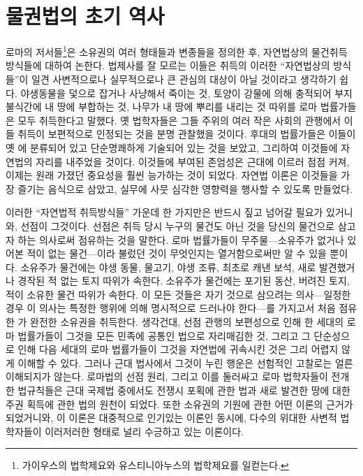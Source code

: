 \chapter{물권법의 초기 역사}

로마의  저서들\footnote{%
  가이우스의 법학제요와 유스티니아누스의 법학제요를 일컫는다.
}은
소유권의 여러 형태들과 변종들을 정의한 후,
자연법상의 물건취득 방식들에 대하여 논한다.
법제사를 잘 모르는 이들은
취득의 이러한 ``자연법상의 방식들''이
일견
사변적으로나 실무적으로나 큰 관심의 대상이 아닐 것이라고
생각하기 쉽다.
야생동물을 덫으로 잡거나 사냥해서 죽이는 것,
토양이 강물에 의해 충적되어 부지불식간에
내 땅에 부합하는 것,
나무가 내 땅에 뿌리를 내리는 것 따위를
로마 법률가들은 모두  취득한다고 말했다.
옛 법학자들은
그들 주위의 여러 작은 사회의 관행에서
이들 취득이
보편적으로 인정되는 것을 분명 관찰했을 것이다.
후대의 법률가들은
이들이 옛 에 분류되어 있고
단순명쾌하게 기술되어 있는 것을 보았고, 그리하여
이것들에
자연법의 자리를
내주었을 것이다.
이것들에 부여된 존엄성은 근대에 이르러 점점 커져,
이제는 원래 가졌던 중요성을 훨씬 능가하는 것이 되었다.
자연법 이론은 이것들을 가장 즐기는 음식으로 삼았고,
실무에 사뭇 심각한 영향력을 행사할 수 있도록 만들었다.

이러한 ``자연법적 취득방식들'' 가운데
한 가지만은 반드시 짚고 넘어갈 필요가 있거니와,
선점이 그것이다.
선점은
취득 당시 누구의 물건도 아닌 것을
당신의 물건으로 삼고자 하는 의사로써
점유하는 것을 말한다.
로마 법률가들이 무주물---소유주가
없거나 있어본 적이 없는 물건---이라 불렀던
것이 무엇인지는 열거함으로써만 알 수 있을 뿐이다.
소유주가  물건에는
야생 동물, 물고기, 야생 조류, 최초로 캐낸 보석,
새로 발견했거나 경작된 적 없는 토지 따위가 속한다.
소유주가  물건에는
포기된 동산, 버려진 토지,
적이 소유한 물건 따위가 속한다.
이 모든 것들은
자기 것으로 삼으려는 의사---일정한 경우 이 의사는
특정한 행위에 의해 명시적으로 드러나야 한다---를 가지고서 처음 점유한
가 완전한 소유권을 취득한다.
생각건대,
선점 관행의 보편성으로 인해
한 세대의 로마 법률가들이 그것을 모든 민족에 공통인 법으로
자리매김한 것,
그리고 그 단순성으로 인해
다음 세대의 로마 법률가들이 그것을 자연법에 귀속시킨 것은
그리 어렵지 않게 이해할 수 있다.
그러나 근대 법사에서 그것이 누린 행운은
선험적인 고찰로는 얼른 이해되지가 않는다.
로마법의 선점 원리, 그리고 이를 둘러싸고 로마 법학자들이 전개한 법규칙들은
근대 국제법 중에서도
전쟁시 포획에 관한 법과
새로 발견한 땅에 대한 주권 획득에 관한 법의
원천이 되었다.
또한 소유권의 기원에 관한 어떤 이론의 근거가 되었거니와,
이 이론은 대중적으로 인기있는 이론인 동시에,
다수의 위대한 사변적 법학자들이
이러저러한 형태로
널리 수긍하고 있는 이론이다.

